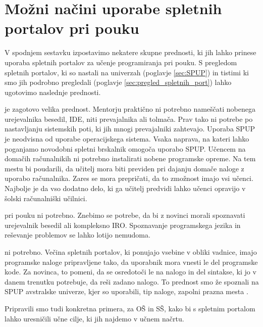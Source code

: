 \section{Možni načini uporabe spletnih portalov pri pouku}
\label{sec:načini_uporabe_sp}

V spodnjem sestavku izpostavimo nekatere skupne prednosti, ki jih
lahko prinese uporaba spletnih portalov za učenje programiranja pri
pouku. S pregledom spletnih portalov, ki so nastali na univerzah
(poglavje \ref{sec:SPUP}) in tistimi ki smo jih podrobno pregledali
(poglavje \ref{sec:pregled_spletnih_port}) lahko ugotovimo naslednje
prednosti.

\begin{description}
\tightlist
\item[Nepotrebna namestitev programske opreme] je zagotovo velika
  prednost. Mentorju praktično ni potrebno nameščati nobenega
  urejevalnika besedil, IDE, niti prevajalnika ali tolmača. Prav tako
  ni potrebe po nastavljanju sistemskih poti, ki jih mnogi
  prevajalniki zahtevajo. Uporaba SPUP je neodvisna od uporabe
  operacijskega sistema. Vsaka naprava, na kateri lahko poganjamo
  novodobni spletni brskalnik omogoča uporabo SPUP. Učencem na domačih
  računalnikih ni potrebno instalirati nobene programske opreme. Na
  tem mestu bi poudarili, da učitelj mora biti previden pri dajanju
  domače naloge z uporabo računalnika. Zares se mora prepričati, da to
  zmožnost imajo vsi učenci. Najbolje je da vso dodatno delo, ki ga
  učitelj predvidi lahko učenci opravijo v šolski računalniški
  učilnici.
\item[Seznanjanje s programsko opremo] pri pouku ni potrebno. Znebimo
  se potrebe, da bi z novinci morali spoznavati urejevalnik besedil
  ali kompleksno IRO. Spoznavanje programskega jezika in reševanje
  problemov se lahko lotijo nemudoma.
\item[Pisanje progama od začetka do konca] ni potrebno. Večina
  spletnih portalov, ki ponujajo vsebine v obliki vadnice, imajo
  programske naloge pripravljene tako, da uporabnik mora vnesti le del
  programske kode. Za novinca, to pomeni, da se osredotoči le na
  nalogo in del sintakse, ki jo v danem trenutku potrebuje, da reši
  zadano nalogo. To prednost smo že spoznali na SPUP avstralske
  univerze, kjer so uporabili, tip naloge, zapolni prazna mesta
  \cite{thesisAWebP}.
\item
\end{description}

Pripravili smo tudi konkretna primera, za OŠ in SŠ, kako bi s spletnim
portalom lahko uresničili učne cilje, ki jih najdemo v učnem načrtu.

